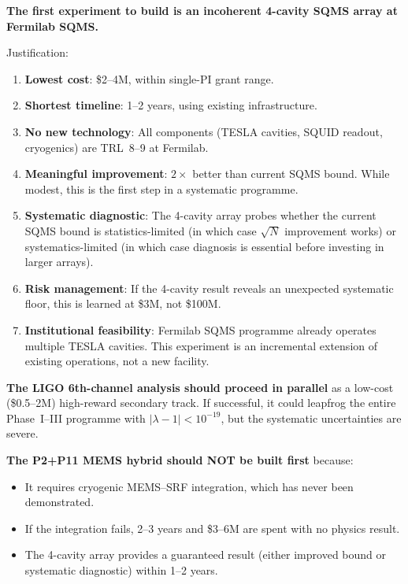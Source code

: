 \documentclass[11pt]{article}
\theoremstyle{definition}
\theoremstyle{remark}
\newcommand{\lamdiff}{|\lambda-1|}
\begin{document}
\begin{tcolorbox}[colback=green!5!white, colframe=green!50!black,
  title=\textbf{ANSWER: SQMS 4-Cavity Incoherent Array at Fermilab}]

\textbf{The first experiment to build is an incoherent 4-cavity SQMS
array at Fermilab SQMS.}

Justification:
\begin{enumerate}
\item \textbf{Lowest cost}: \$2--4M, within single-PI grant range.
\item \textbf{Shortest timeline}: 1--2 years, using existing infrastructure.
\item \textbf{No new technology}: All components (TESLA cavities, SQUID
  readout, cryogenics) are TRL~8--9 at Fermilab.
\item \textbf{Meaningful improvement}: $2\times$ better than current SQMS
  bound. While modest, this is the first step in a systematic programme.
\item \textbf{Systematic diagnostic}: The 4-cavity array probes whether
  the current SQMS bound is statistics-limited (in which case
  $\sqrt{N}$ improvement works) or systematics-limited (in which case
  diagnosis is essential before investing in larger arrays).
\item \textbf{Risk management}: If the 4-cavity result reveals an
  unexpected systematic floor, this is learned at \$3M, not \$100M.
\item \textbf{Institutional feasibility}: Fermilab SQMS programme already
  operates multiple TESLA cavities. This experiment is an incremental
  extension of existing operations, not a new facility.
\end{enumerate}

\textbf{The LIGO 6th-channel analysis should proceed in parallel} as
a low-cost (\$0.5--2M) high-reward secondary track. If successful, it
could leapfrog the entire Phase~I--III programme with $\lamdiff < 10^{-19}$,
but the systematic uncertainties are severe.

\textbf{The P2+P11 MEMS hybrid should NOT be built first} because:
\begin{itemize}[nosep]
\item It requires cryogenic MEMS--SRF integration, which has never been
  demonstrated.
\item If the integration fails, 2--3 years and \$3--6M are spent with
  no physics result.
\item The 4-cavity array provides a guaranteed result (either improved
  bound or systematic diagnostic) within 1--2 years.
\end{itemize}
\end{tcolorbox}
\end{document}
